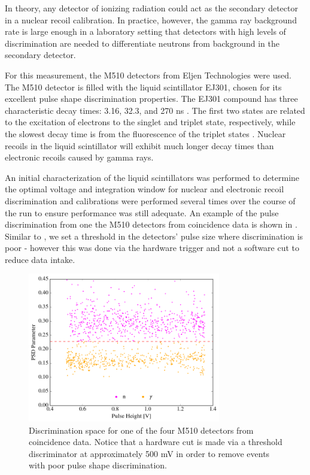 In theory, any detector of ionizing radiation could act as the secondary detector in a nuclear recoil calibration.  In practice, however, the gamma ray background rate is large enough in a laboratory setting that detectors with high levels of discrimination are needed to differentiate neutrons from background in the secondary detector.  

For this measurement, the M510 detectors from Eljen Technologies were used.  The M510 detector is filled with the liquid scintillator EJ301, chosen for its excellent pulse shape discrimination properties.  The EJ301 compound has three characteristic decay times: 3.16, 32.3, and 270 ns \cite{kuchnir1968time, ej301_manual}.  The first two states are related to the excitation of electrons to the singlet and triplet state, respectively, while the slowest decay time is from the fluorescence of the triplet states \cite{lang2017improved}.  Nuclear recoils in the liquid scintillator will exhibit much longer decay times than electronic recoils caused by gamma rays.  

An initial characterization of the liquid scintillators was performed to determine the optimal voltage and integration window for nuclear and electronic recoil discrimination and calibrations were performed several times over the course of the run to ensure performance was still adequate.  An example of the pulse discrimination from one the M510 detectors from coincidence data is shown in .  Similar to , we set a threshold in the detectors' pulse size where discrimination is poor - however this was done via the hardware trigger and not a software cut to reduce data intake. 

\begin{figure}[t]
        \centering
	\includegraphics[width=0.75\textwidth]{nerix_coin_ej}
	\caption{Discrimination space for one of the four M510 detectors from coincidence data.  Notice that a hardware cut is made via a threshold discriminator at approximately 500 mV in order to remove events with poor pulse shape discrimination.}
	\label{fig:nerix_ej_discrimination}
\end{figure}

